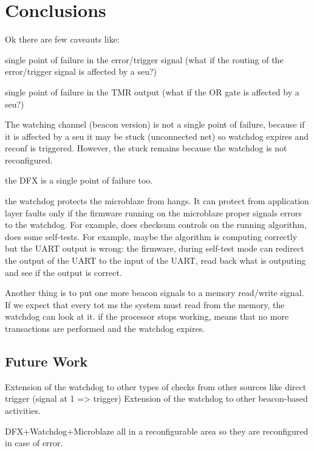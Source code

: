 \chapter{Conclusions}

Ok there are few caveauts like: 

single point of failure in the error/trigger signal (what if the routing of the error/trigger signal is affected by a seu?)

single point of failure in the TMR output (what if the OR gate is affected by a seu?)

The watching channel (beacon version) is not a single point of failure, because if it is affected by a seu it may be stuck (unconnected net) so watchdog expires and reconf is triggered. However, the stuck remains because the watchdog is not reconfigured.

the DFX is a single point of failure too.


the watchdog protects the microblaze from hangs. It can protect from application layer faults only if the firmware running on the microblaze proper signals errors to the watchdog. For example, does checksum controls on the running algorithm, does some self-tests. For example, maybe the algorithm is computing correctly but the UART output is wrong: the firmware, during self-test mode can redirect the output of the UART to the input of the UART, read back what is outputing and see if the output is correct. 

Another thing is to put one more beacon signals to a memory read/write signal. If we expect that every tot ms the system must read from the memory, the watchdog can look at it. if the processor stops working, means that no more transactions are performed and the watchdog expires.


\section{Future Work}

Extension of the watchdog to other types of checks from other sources like direct trigger (signal at 1 => trigger)
Extension of the watchdog to other beacon-based activities.

DFX+Watchdog+Microblaze all in a reconfigurable area so they are reconfigured in case of error.
